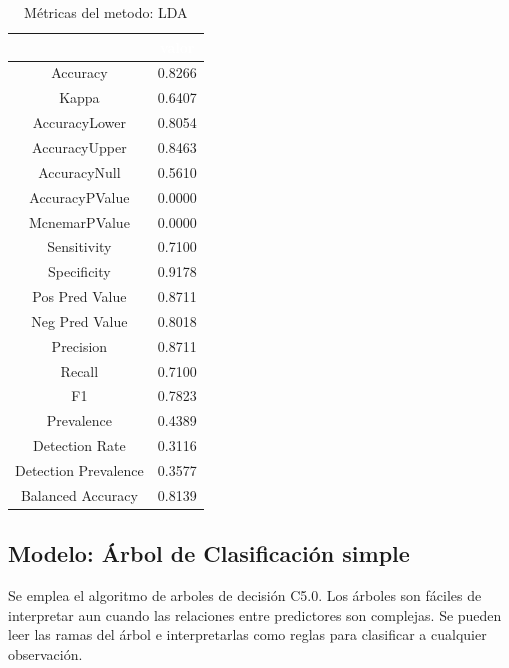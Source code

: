 \begin{table}[!h]
	
	\caption{\label{tab:metricas_LDA}Métricas del metodo: LDA }
	\centering
	\begin{tabular}[t]{cc}
		\toprule
		\rowcolor{black}  \multicolumn{1}{c}{\textcolor{white}{\textbf{metricas}}} & \multicolumn{1}{c}{\textcolor{white}{\textbf{valor}}}\\
		\midrule
		\rowcolor{gray!6}  Accuracy & 0.8266\\
		Kappa & 0.6407\\
		\rowcolor{gray!6}  AccuracyLower & 0.8054\\
		AccuracyUpper & 0.8463\\
		\rowcolor{gray!6}  AccuracyNull & 0.5610\\
		\addlinespace
		AccuracyPValue & 0.0000\\
		\rowcolor{gray!6}  McnemarPValue & 0.0000\\
		Sensitivity & 0.7100\\
		\rowcolor{gray!6}  Specificity & 0.9178\\
		Pos Pred Value & 0.8711\\
		\addlinespace
		\rowcolor{gray!6}  Neg Pred Value & 0.8018\\
		Precision & 0.8711\\
		\rowcolor{gray!6}  Recall & 0.7100\\
		F1 & 0.7823\\
		\rowcolor{gray!6}  Prevalence & 0.4389\\
		\addlinespace
		Detection Rate & 0.3116\\
		\rowcolor{gray!6}  Detection Prevalence & 0.3577\\
		Balanced Accuracy & 0.8139\\
		\bottomrule
	\end{tabular}
\end{table}



\subsection{Modelo: Árbol de Clasificación simple}

Se emplea el algoritmo de arboles de decisión C5.0. Los árboles son
fáciles de interpretar aun cuando las relaciones entre predictores son
complejas. Se pueden leer las ramas del árbol e interpretarlas como reglas para clasificar a cualquier observación.

